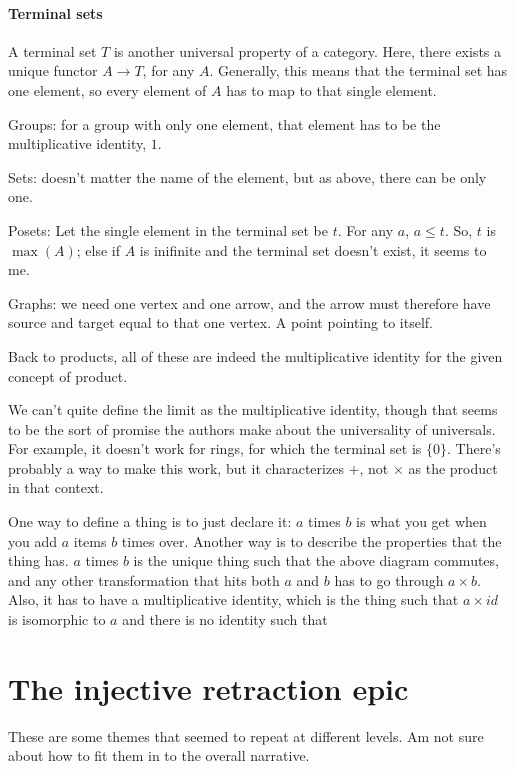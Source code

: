\documentclass[11pt]{article}
\begin{document}
\paragraph{Terminal sets} A terminal set $T$ is another universal property of a
category. Here, there exists a unique functor $A\to T$, for any $A$. Generally, this
means that the terminal set has one element, so every element of $A$ has to map to
that single element.

Groups: for a group with only one element, that element has to be the multiplicative identity, $1$.

Sets: doesn't matter the name of the element, but as above, there can be only one.

Posets: Let the single element in the terminal set be $t$. For any $a$, $a\leq t$. So, $t$
is $\max(A)$; else if $A$ is inifinite and the terminal set doesn't exist, it seems to me.

Graphs: we need one vertex and one arrow, and the arrow must therefore have source and
target equal to that one vertex. A point pointing to itself.

Back to products, all of these are indeed the multiplicative identity for the given
concept of product.

We can't quite define the limit as the multiplicative identity, though that seems to be
the sort of  promise the authors make about the universality of universals. For example,
it doesn't work for rings, for which the terminal set is $\{0\}$. There's probably a way
to make this work, but it characterizes $+$, not $\times$ as the product in that context.

One way to define a thing is to just declare it: $a$ times $b$ is what you get when you
add $a$ items $b$ times over. Another way is to describe the properties that the thing
has. $a$ times $b$ is the unique thing such that the above diagram commutes, and any other
transformation that hits both $a$ and $b$ has to go through $a\times b$. Also, it has to
have a multiplicative identity, which is the thing such that $a\times id$ is isomorphic
to $a$ and there is no identity such that 

\section{The injective retraction epic}\label{injectivesec}
These are some themes that seemed to repeat at
different levels. Am not sure about how to fit them in to the overall narrative.
\end{document}
